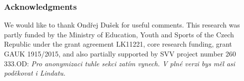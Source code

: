 \documentclass[runningheads,a4paper]{llncs}
\newcommand{\commentontext}[2]{\colorbox{yellow!60}{#1}\pdfcomment[color={0.234 0.867 0.211},hoffset=-6pt,voffset=10pt,opacity=0.5]{#2}}
\def\OD#1{{\color{darkgreen}OD: \it #1}}
\begin{document}
\vspace{-1.40em}
\subsubsection*{Acknowledgments}
We would like to thank Ondřej Dušek for useful comments.
This research was partly funded by the Ministry of Education, Youth and Sports of the Czech Republic under the grant agreement LK11221, core research funding, grant GAUK 1915/2015, and also partially supported by SVV project number 260 333.\OD{Pro anonymizaci tuhle sekci zatím vynech. V plné verzi bys měl asi poděkovat i Lindatu.} 

%
%
%
%
%
%


\vspace{-1.00em}



\end{document}
